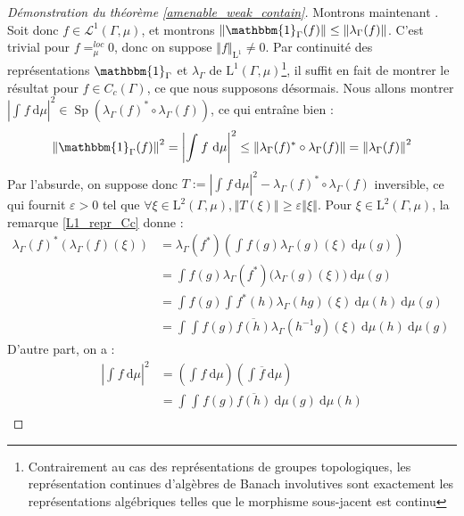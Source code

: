 \documentclass[a4paper,12pt]{article}
\newcommand{\norm}[1]{\left\Vert #1\right\Vert}
\newcommand{\abs}[1]{\left\vert#1\right\vert}
\newcommand{\indic}{\mathbbm{1}}
\newcommand{\integral}[4]{\int_{#1}^{#2} #3~\mathrm{d}#4}
\newcommand{\inv}{^{-1}}
\newcommand{\comp}{\circ}
\renewcommand{\implies}{\Rightarrow}
\newcommand{\TODO}[1]{}%
\DeclareMathOperator{\Sp}{Sp}
\begin{document}
\begin{proof}[Démonstration du théorème \ref{amenable_weak_contain}]
    Montrons maintenant \framebox{$(\ref{amenable_weak_contain/strong_almost_invariant})\implies(\ref{amenable_weak_contain/weak_contain})$}. Soit donc $f\in\mathscr{L}^1(\Gamma, \mu)$,
    et montrons $\norm{\indic_\Gamma(f)}\le\norm{\lambda_\Gamma(f)}$. C'est trivial pour $f=_\mu^{loc} 0$, donc on suppose $\norm{f}_{\mathrm{L}^1}\ne0$. Par continuité des représentations $\indic_\Gamma$ et 
    $\lambda_\Gamma$ de $\mathrm{L}^1(\Gamma, \mu)$\footnote{Contrairement au cas des représentations de groupes topologiques, 
    les représentation continues d'algèbres de Banach involutives sont exactement les représentations algébriques telles que le 
    morphisme sous-jacent est continu}, il suffit en fait de montrer le résultat pour $f\in C_c(\Gamma)$, ce que nous supposons désormais.
    Nous allons montrer $\abs{\integral{}{}{f}{\mu}}^2\in\Sp\left(\lambda_\Gamma(f)^*\comp \lambda_\Gamma(f)\right)$, ce qui entraîne bien :
    \begin{equation*}
        \norm{\indic_\Gamma(f)}^2=\abs{\integral{}{}{f}{\mu}}^2\le\norm{\lambda_\Gamma(f)^*\comp \lambda_\Gamma(f)} = \norm{\lambda_\Gamma(f)}^2
    \end{equation*}
    Par l'absurde, on suppose donc $T := \abs{\integral{}{}{f}{\mu}}^2 - \lambda_\Gamma(f)^*\comp \lambda_\Gamma(f)$ inversible, ce qui fournit $\varepsilon>0$
    tel que $\forall\xi\in\mathrm{L}^2(\Gamma, \mu), \norm{T(\xi)}\ge\varepsilon\norm{\xi}$.
    Pour $\xi\in\mathrm{L}^2(\Gamma, \mu)$, la remarque \ref{L1_repr_Cc} donne :
    \begin{align*}
        \lambda_\Gamma(f)^*\left(\lambda_\Gamma(f)(\xi)\right) 
            &= \lambda_\Gamma(f^*)\left(\integral{}{}{f(g)\lambda_\Gamma(g)(\xi)}{\mu(g)}\right) \\
            &= \integral{}{}{f(g)\lambda_\Gamma(f^*)\Big(\lambda_\Gamma(g)(\xi)\Big)}{\mu(g)} \\
            &= \integral{}{}{f(g)\integral{}{}{f^*(h)\lambda_\Gamma(hg)(\xi)}{\mu(h)}}{\mu(g)} \\
            &= \integral{}{}{\integral{}{}{f(g)\overline{f(h)}\lambda_\Gamma(h\inv g)(\xi)}{\mu(h)}}{\mu(g)}\quad\text{\TODO{explications}}
    \end{align*} 
    D'autre part, on a :
    \begin{align*}
        \abs{\integral{}{}{f}{\mu}}^2 
            &= \left(\integral{}{}{f}{\mu}\right)\left(\integral{}{}{\overline{f}}{\mu}\right) \\
            &= \integral{}{}{\integral{}{}{f(g)\overline{f(h)}}{\mu(g)}}{\mu(h)}

\end{align*}
\end{proof}
\end{document}
